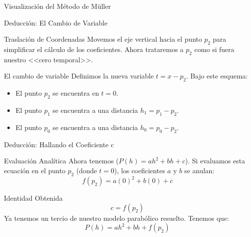 \documentclass[aspectratio=169, t]{beamer}
\begin{document}
\begin{frame}{Visualización del Método de Müller}
\begin{center}
    \end{center}
\end{frame}

\begin{frame}{Deducción: El Cambio de Variable}
    \begin{concept}{Traslación de Coordenadas}
        Movemos el eje vertical hacia el punto $p_2$ para simplificar el cálculo de los coeficientes. Ahora trataremos a $p_2$ como si fuera nuestro <<cero temporal>>.
    \end{concept}

    \vspace{0.1cm}
    \begin{mathstep}{El cambio de variable}
    Definimos la nueva variable $\displaystyle t = x - p_2$. Bajo este esquema:
    \begin{itemize}
        \item El punto $p_2$ se encuentra en $t = 0$.
        \item El punto $p_1$ se encuentra a una distancia $h_1 = p_1 - p_2$.
        \item El punto $p_0$ se encuentra a una distancia $h_0 = p_0 - p_2$.
    \end{itemize}
    \end{mathstep}
\end{frame}

\begin{frame}{Deducción: Hallando el Coeficiente c}
    \vspace{-0.1cm}
    \begin{mathstep}{Evaluación Analítica}
        Ahora tenemos ($P(h) = ah^2 + bh + c$). Si evaluamos esta ecuación en el punto $p_2$ (donde $t = 0$), los coeficientes $a$ y $b$ se anulan:
        \[ f(p_2) = a(0)^2 + b(0) + c \]
    \end{mathstep}

    \vspace{-0.2cm}
    \begin{concept}{Identidad Obtenida}
        \[ c = f(p_2) \]
        Ya tenemos un tercio de nuestro modelo parabólico resuelto. Tenemos que:
        \[ P(h) = ah^2 + bh + f(p_2) \]
    \end{concept}
\end{frame}
\end{document}
